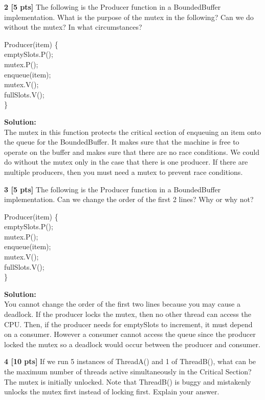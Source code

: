 \documentclass[12pt]{article}
\newcommand\tab[1][1cm]{\hspace*{#1}}
\begin{document}
{\bf 2 [5 pts]} The following is the Producer function in a BoundedBuffer implementation. What is the purpose of the mutex in the following? Can we do without the mutex? In what circumstances? 

Producer(item) \{\\
\tab emptySlots.P();\\
\tab mutex.P();\\
\tab enqueue(item);\\
\tab mutex.V();\\
\tab fullSlots.V();\\
\}

{\bf Solution:}\\

The mutex in this function protects the critical section of enqueuing an item onto the queue for the BoundedBuffer. It makes sure that the machine is free to operate on the buffer and makes sure that there are no race conditions. We could do without the mutex only in the case that there is one producer. If there are multiple producers, then you must need a mutex to prevent race conditions. 

{\bf 3 [5 pts]} The following is the Producer function in a BoundedBuffer implementation. Can we change the order of the first 2 lines? Why or why not?

Producer(item) \{\\
\tab emptySlots.P();\\
\tab mutex.P();\\
\tab enqueue(item);\\
\tab mutex.V();\\
\tab fullSlots.V();\\
\}

{\bf Solution:}\\

You cannot change the order of the first two lines because you may cause a deadlock. If the producer locks the mutex, then no other thread can access the CPU. Then, if the producer needs for emptySlots to increment, it must depend on a consumer. However a consumer cannot access the queue since the producer locked the mutex so a deadlock would occur between the producer and consumer. 

{\bf 4 [10 pts]} If we run 5 instances of ThreadA() and 1 of ThreadB(), what can be the maximum number of threads active simultaneously in the Critical Section? The mutex is initially unlocked. Note that ThreadB() is buggy and mistakenly unlocks the mutex first instead of locking first. Explain your answer. 
\end{document}
